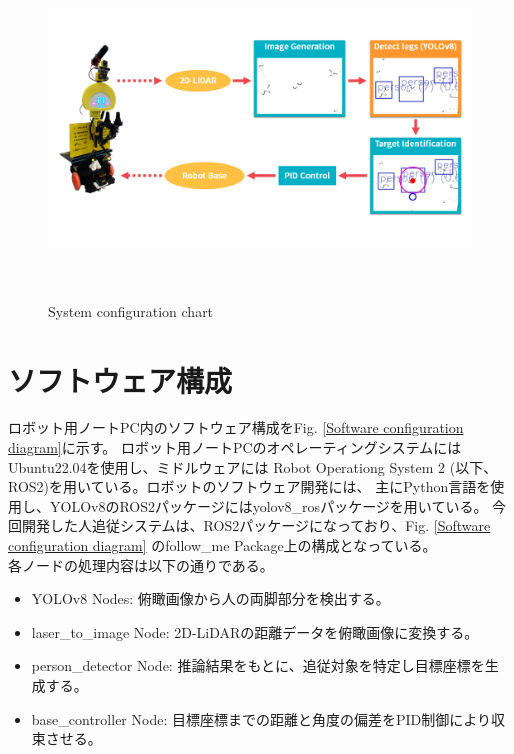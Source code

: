 \begin{figure}[h]
    \begin{center}
    \includegraphics[height=90mm,clip]{figure/System-configration-chart.png}
    \caption{System configuration chart}
    \label{System configuration chart}
    \end{center}
\end{figure}

\section{ソフトウェア構成}
ロボット用ノートPC内のソフトウェア構成をFig. \ref{Software configuration diagram}に示す。
ロボット用ノートPCのオペレーティングシステムにはUbuntu22.04を使用し、ミドルウェアには
Robot Operationg System 2 (以下、ROS2)を用いている。ロボットのソフトウェア開発には、
主にPython言語を使用し、YOLOv8のROS2パッケージにはyolov8\_rosパッケージを用いている。
今回開発した人追従システムは、ROS2パッケージになっており、Fig. \ref{Software configuration diagram}
のfollow\_me Package上の構成となっている。\\ \indent
各ノードの処理内容は以下の通りである。

\begin{itemize}
    \item YOLOv8 Nodes: 俯瞰画像から人の両脚部分を検出する。
    \item laser\_to\_image Node: 2D-LiDARの距離データを俯瞰画像に変換する。
    \item person\_detector Node: 推論結果をもとに、追従対象を特定し目標座標を生成する。
    \item base\_controller Node: 目標座標までの距離と角度の偏差をPID制御により収束させる。
\end{itemize}

